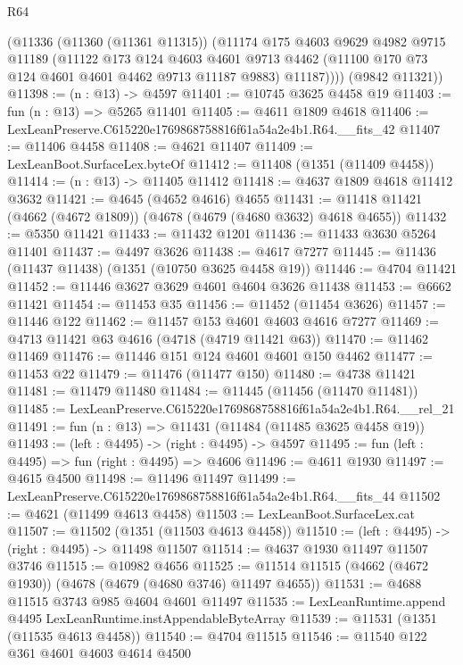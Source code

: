 \begin{lexlean}{R64}
\begin{coremodule}
        (@11336
          (@11360 (@11361 @11315))
          (@11174
            @175
            @4603
            @9629
            @4982
            @9715
            @11189
            (@11122
              @173
              @124
              @4603
              @4601
              @9713
              @4462
              (@11100 @170 @73 @124 @4601 @4601 @4462 @9713 @11187 @9883)
              @11187))))
      (@9842 @11321))
@11398 := (n : @13) -> @4597
@11401 := @10745 @3625 @4458 @19
@11403 := fun (n : @13) => @5265 @11401
@11405 := @4611 @1809 @4618
@11406 := LexLeanPreserve.C615220e1769868758816f61a54a2e4b1.R64.__fits_42
@11407 := @11406 @4458
@11408 := @4621 @11407
@11409 := LexLeanBoot.SurfaceLex.byteOf
@11412 := @11408 (@1351 (@11409 @4458))
@11414 := (n : @13) -> @11405 @11412
@11418 := @4637 @1809 @4618 @11412 @3632
@11421 := @4645 (@4652 @4616) @4655
@11431 := @11418 @11421 (@4662 (@4672 @1809)) (@4678 (@4679 (@4680 @3632) @4618 @4655))
@11432 := @5350 @11421
@11433 := @11432 @1201
@11436 := @11433 @3630 @5264 @11401
@11437 := @4497 @3626
@11438 := @4617 @7277
@11445 := @11436 (@11437 @11438) (@1351 (@10750 @3625 @4458 @19))
@11446 := @4704 @11421
@11452 := @11446 @3627 @3629 @4601 @4604 @3626 @11438
@11453 := @6662 @11421
@11454 := @11453 @35
@11456 := @11452 (@11454 @3626)
@11457 := @11446 @122
@11462 := @11457 @153 @4601 @4603 @4616 @7277
@11469 := @4713 @11421 @63 @4616 (@4718 (@4719 @11421 @63))
@11470 := @11462 @11469
@11476 := @11446 @151 @124 @4601 @4601 @150 @4462
@11477 := @11453 @22
@11479 := @11476 (@11477 @150)
@11480 := @4738 @11421
@11481 := @11479 @11480
@11484 := @11445 (@11456 (@11470 @11481))
@11485 := LexLeanPreserve.C615220e1769868758816f61a54a2e4b1.R64.__rel_21
@11491 := fun (n : @13) => @11431 (@11484 (@11485 @3625 @4458 @19))
@11493 := (left : @4495) -> (right : @4495) -> @4597
@11495 := fun (left : @4495) => fun (right : @4495) => @4606
@11496 := @4611 @1930
@11497 := @4615 @4500
@11498 := @11496 @11497
@11499 := LexLeanPreserve.C615220e1769868758816f61a54a2e4b1.R64.__fits_44
@11502 := @4621 (@11499 @4613 @4458)
@11503 := LexLeanBoot.SurfaceLex.cat
@11507 := @11502 (@1351 (@11503 @4613 @4458))
@11510 := (left : @4495) -> (right : @4495) -> @11498 @11507
@11514 := @4637 @1930 @11497 @11507 @3746
@11515 := @10982 @4656
@11525 := @11514 @11515 (@4662 (@4672 @1930)) (@4678 (@4679 (@4680 @3746) @11497 @4655))
@11531 := @4688 @11515 @3743 @985 @4604 @4601 @11497
@11535 := LexLeanRuntime.append @4495 LexLeanRuntime.instAppendableByteArray
@11539 := @11531 (@1351 (@11535 @4613 @4458))
@11540 := @4704 @11515
@11546 := @11540 @122 @361 @4601 @4603 @4614 @4500

\end{coremodule}
\end{lexlean}
